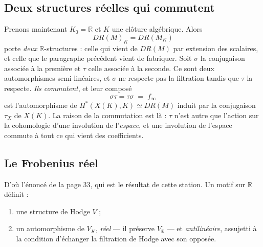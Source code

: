 \documentclass[11pt,a4paper]{article}
\begin{document}
\subsection*{Deux structures réelles qui commutent}

Prenons maintenant $K_{0} = \mathbb{R}$ et $K$ une clôture algébrique. Alors
\[
  DR(M)_{K} = DR(M_{K})
\]
porte \emph{deux} $\mathbb{R}$-structures : celle qui vient de $DR(M)$ par
extension des scalaires, et celle que le paragraphe précédent vient de
fabriquer. Soit $\sigma$ la conjugaison associée à la première et $\tau$ celle
associée à la seconde. Ce sont deux automorphismes semi-linéaires, et $\sigma$
ne respecte pas la filtration tandis que $\tau$ la respecte. \emph{Ils
commutent}, et leur composé
\[
  \sigma\tau = \tau\sigma \;=\; f_{\infty}
\]
est l'automorphisme de $H^{*}(X(K), K) \simeq DR(M)$ induit par la conjugaison
$\tau_{X}$ de $X(K)$. La raison de la commutation est là : $\tau$ n'est autre
que l'action sur la cohomologie d'une involution de l'\emph{espace}, et une
involution de l'espace commute à tout ce qui vient des coefficients.

\subsection*{Le Frobenius réel}

D'où l'énoncé de la page 33, qui est le résultat de cette station. Un motif sur
$\mathbb{R}$ définit :

\begin{enumerate}
  \item une structure de Hodge $V$ ;
  \item un automorphisme de $V_{K}$, \emph{réel} — il préserve
        $V_{\mathbb{R}}$ — et \emph{antilinéaire}, assujetti à la condition
        d'échanger la filtration de Hodge avec son opposée.
\end{enumerate}
\end{document}

